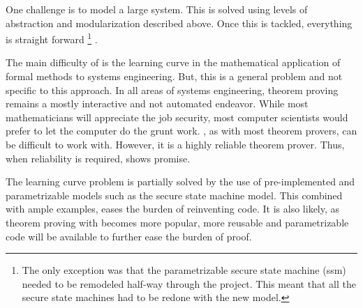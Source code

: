 \documentclass[../../main/main.tex]{subfiles}
\begin{document}
One challenge is to model a large system.  This is solved using levels of abstraction and modularization described above.  Once this is tackled, everything is straight forward \footnote{The only exception was that the parametrizable secure state machine (ssm) needed to be remodeled half-way through the project.  This meant that all the secure state machines had to be redone with the new model.} .

The main difficulty of  is the learning curve in the mathematical application of formal methods to systems engineering.  But, this is a general problem and not specific to this approach. In all areas of systems engineering, theorem proving remains a mostly interactive and not automated endeavor.  While most mathematicians will appreciate the job security, most computer scientists would prefer to let the computer do the grunt work.  , as with most theorem provers,  can be difficult to work with.  However, it is a highly reliable theorem prover.  Thus, when reliability is required,  shows promise. 


The learning curve problem is partially solved by the use of pre-implemented and parametrizable models such as the secure state machine model.  This combined with ample examples, eases the burden of reinventing  code. It is also likely, as theorem proving with  becomes more popular, more reusable and parametrizable code will be available to further ease the burden of proof.  
\end{document}
